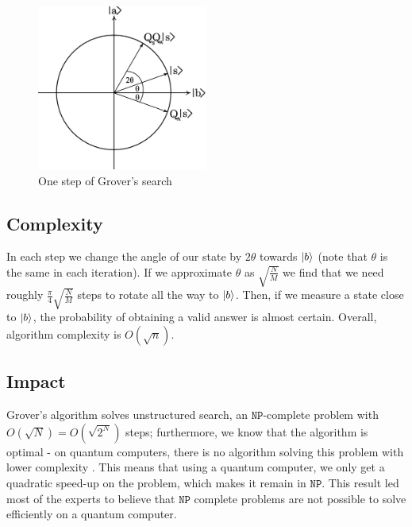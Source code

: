 \begin{figure}[ht!]
  \begin{center}
    \includegraphics[width=0.5\textwidth]{figures/grover.png}
  \end{center}
  \caption{One step of Grover's search}\label{fig:grover}
\end{figure}

\subsection{Complexity}
In each step we change the angle of our state by $2 \theta$ towards $\ket{b}$ (note that $\theta$ is the same in each iteration). If we approximate $\theta$ as $\sqrt{\frac{N}{M}}$ we find that we need roughly $\frac{\pi}{4}\sqrt{\frac{N}{M}}$ steps to rotate all the way to $\ket{b}$. Then, if we measure a state close to $\ket{b}$, the probability of obtaining a valid answer is almost certain. Overall, algorithm complexity is $O(\sqrt{n})$. \subsection{Impact}
Grover's algorithm solves unstructured search, an $\mathtt{NP}$-complete problem with $O(\sqrt{N})=O(\sqrt{2^N})$ steps; furthermore, we know that the algorithm is optimal - on quantum computers, there is no algorithm solving this problem with lower complexity \cite{Zalka_1999}. This means that using a quantum computer, we only get a quadratic speed-up on the problem, which makes it remain in $\mathtt{NP}$. This result led most of the experts to believe that $\mathtt{NP}$ complete problems are not possible to solve efficiently on a quantum computer.
